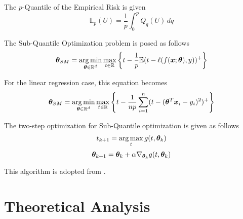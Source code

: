 \documentclass{article} %
\begin{document}
	The $p$-Quantile of the Empirical Risk is given
	\begin{equation}
		\mathbb{L}_p(U) = \frac{1}{p}\int_0^p Q_q(U)\,dq
	\end{equation}
	
	The Sub-Quantile Optimization problem is posed as follows
	\begin{equation}
		{\bm{\theta}}_{SM} = \operatorname*{arg\,min}_{{\bm{\theta}} \in \mathbb{R}^d} \max_{t \in \mathbb{R}} \left\{t - \frac{1}{p}\mathbb{E}(t - \ell(f({\bm{x}};{\bm{\theta}}),y))^+\right\}
	\end{equation}
	
	For the linear regression case, this equation becomes 
	\begin{equation}
		\label{eqn:theta_sm}
		{\bm{\theta}}_{SM} = \operatorname*{arg\,min}_{{\bm{\theta}} \in \mathbb{R}^d} \max_{t \in \mathbb{R}} \left\{t - \frac{1}{np}\sum_{i=1}^n(t-({\bm{\theta}}^T{\bm{x}}_i - y_i)^2)^+\right\}
	\end{equation}
		
	The two-step optimization for Sub-Quantile optimization is given as follows \vspace{1em}
	\begin{equation}
		\label{eqn:t-update}
		t_{k+1} = \operatorname*{arg\,max}_t g(t,{\bm{\theta}}_k) 
	\end{equation}
	\begin{equation}
		\label{eqn:theta-update}
		{\bm{\theta}}_{k+1} = {\bm{\theta}}_k + \alpha \nabla_{{\bm{\theta}}_k} g(t,{\bm{\theta}}_k)
	\end{equation}
		
	This algorithm is adopted from \cite{Razaviyayn}. 
	
	\section{Theoretical Analysis}
	
\end{document}
